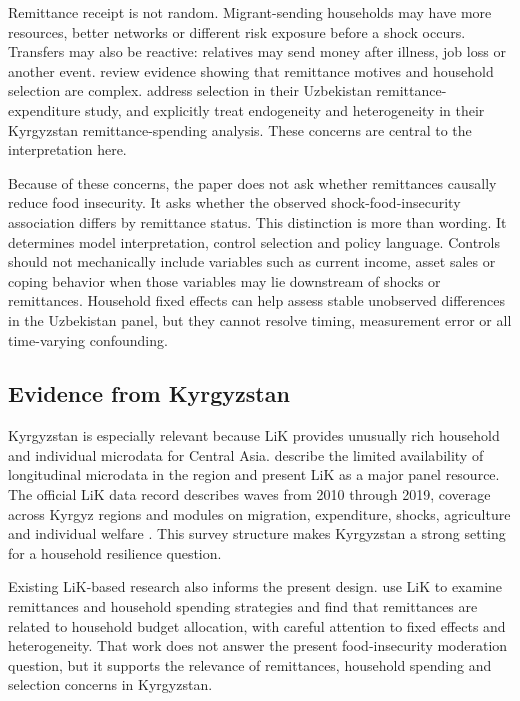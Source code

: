 \documentclass[11pt]{article}
\begin{document}
Remittance receipt is not random. Migrant-sending households may have more resources, better networks or different risk exposure before a shock occurs. Transfers may also be reactive: relatives may send money after illness, job loss or another event. \textcite{AzamGubert2006} review evidence showing that remittance motives and household selection are complex. \textcite{Kakhkharov2021} address selection in their Uzbekistan remittance-expenditure study, and \textcite{Wang2021} explicitly treat endogeneity and heterogeneity in their Kyrgyzstan remittance-spending analysis. These concerns are central to the interpretation here.

Because of these concerns, the paper does not ask whether remittances causally reduce food insecurity. It asks whether the observed shock-food-insecurity association differs by remittance status. This distinction is more than wording. It determines model interpretation, control selection and policy language. Controls should not mechanically include variables such as current income, asset sales or coping behavior when those variables may lie downstream of shocks or remittances. Household fixed effects can help assess stable unobserved differences in the Uzbekistan panel, but they cannot resolve timing, measurement error or all time-varying confounding.

\subsection{Evidence from Kyrgyzstan}

Kyrgyzstan is especially relevant because LiK provides unusually rich household and individual microdata for Central Asia. \textcite{Brueck2014} describe the limited availability of longitudinal microdata in the region and present LiK as a major panel resource. The official LiK data record describes waves from 2010 through 2019, coverage across Kyrgyz regions and modules on migration, expenditure, shocks, agriculture and individual welfare \parencite{LIK2023}. This survey structure makes Kyrgyzstan a strong setting for a household resilience question.

Existing LiK-based research also informs the present design. \textcite{Wang2021} use LiK to examine remittances and household spending strategies and find that remittances are related to household budget allocation, with careful attention to fixed effects and heterogeneity. That work does not answer the present food-insecurity moderation question, but it supports the relevance of remittances, household spending and selection concerns in Kyrgyzstan.
\end{document}
